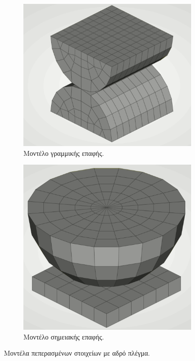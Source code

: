 \documentclass{article}
\begin{document}
\begin{figure}[H]
    \centering
    \begin{subfigure}{0.49\linewidth}
        \centering
        \includegraphics[width=0.7\linewidth]{media/lcoarse.png}
        \caption{Μοντέλο γραμμικής επαφής.}
    \end{subfigure}
    \hfill
    \begin{subfigure}{0.49\linewidth}
        \centering
        \includegraphics[width=0.6\linewidth]{media/pcoarse.png}
        \caption{Μοντέλο σημειακής επαφής.}
    \end{subfigure}
    \caption{Μοντέλα πεπερασμένων στοιχείων με αδρό πλέγμα.}
    \label{fig:mod}
\end{figure}
\end{document}
